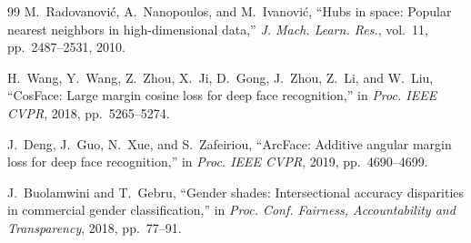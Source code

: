 \documentclass[conference]{IEEEtran}
\begin{document}
\begin{thebibliography}{99}
M.~Radovanovi\'{c}, A.~Nanopoulos, and M.~Ivanovi\'{c}, ``Hubs in space: Popular
nearest neighbors in high-dimensional data,'' \emph{J. Mach. Learn. Res.}, vol.~11,
pp.\ 2487--2531, 2010.

H.~Wang, Y.~Wang, Z.~Zhou, X.~Ji, D.~Gong, J.~Zhou, Z.~Li, and W.~Liu, ``CosFace:
Large margin cosine loss for deep face recognition,'' in \emph{Proc. IEEE CVPR},
2018, pp.\ 5265--5274.

J.~Deng, J.~Guo, N.~Xue, and S.~Zafeiriou, ``ArcFace: Additive angular margin loss
for deep face recognition,'' in \emph{Proc. IEEE CVPR}, 2019, pp.\ 4690--4699.

J.~Buolamwini and T.~Gebru, ``Gender shades: Intersectional accuracy disparities in
commercial gender classification,'' in \emph{Proc. Conf. Fairness, Accountability
and Transparency}, 2018, pp.\ 77--91.

\end{thebibliography}
\end{document}
